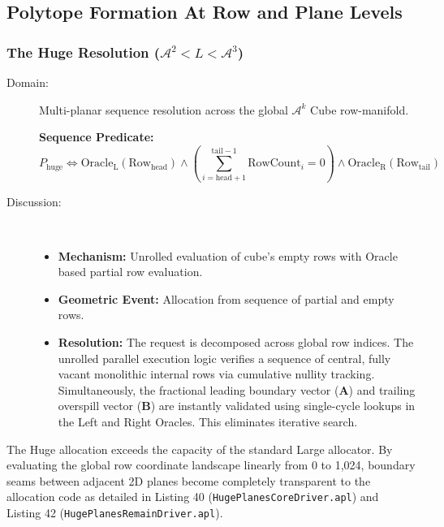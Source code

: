 \documentclass[11pt]{article}
\begin{document}
\subsection{Polytope Formation At Row and Plane Levels}

\subsubsection{The Huge Resolution ($\mathcal{A}^2 < L < \mathcal{A}^3$)}

\begin{description}
    \item[Domain:] Multi-planar sequence resolution across the global $\mathcal{A}^k$ Cube row-manifold.
    
\vspace{12pt}
\setcounter{equation}{10}
\noindent \textbf{Sequence Predicate:} 
\begin{equation}
    P_{\text{huge}} \iff \text{Oracle}_{\text{L}}(\text{Row}_{\text{head}}) \wedge \left( \sum_{i=\text{head}+1}^{\text{tail}-1} \text{RowCount}_i = 0 \right) \wedge \text{Oracle}_{\text{R}}(\text{Row}_{\text{tail}})
    \label{eq:huge_sequence_predicate}
\end{equation}

    \item[Discussion:] \hfill \\
\begin{itemize}
    \item \textbf{Mechanism:} Unrolled evaluation of cube's empty rows with Oracle based partial row evaluation.
    
    \item \textbf{Geometric Event:} Allocation from sequence of partial and empty rows.
    
    \item \textbf{Resolution:} The request is decomposed across global row indices. The unrolled parallel execution logic verifies a sequence of central, fully vacant monolithic internal rows via cumulative nullity tracking. Simultaneously, the fractional leading boundary vector (\textbf{A}) and trailing overspill vector (\textbf{B}) are instantly validated using single-cycle lookups in the Left and Right Oracles. This eliminates iterative search.
\end{itemize}
\end{description}

The Huge allocation exceeds the capacity of the standard Large allocator. By evaluating the global row coordinate landscape linearly from 0 to 1,024, boundary seams between adjacent 2D planes become completely transparent to the allocation code as detailed in Listing 40 (\texttt{HugePlanesCoreDriver.apl}) and Listing 42 (\texttt{HugePlanesRemainDriver.apl}). 
\end{document}
